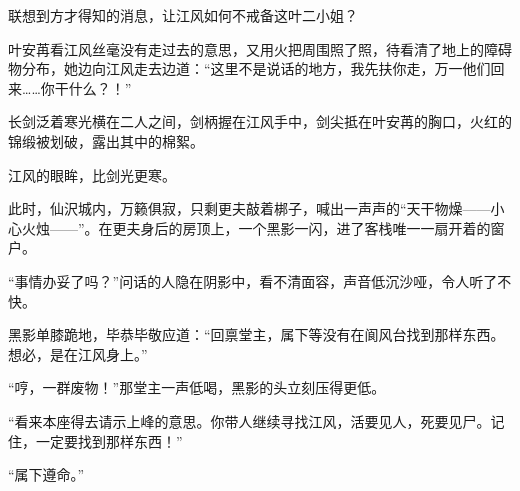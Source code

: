 联想到方才得知的消息，让江风如何不戒备这叶二小姐？

叶安苒看江风丝毫没有走过去的意思，又用火把周围照了照，待看清了地上的障碍物分布，她边向江风走去边道：“这里不是说话的地方，我先扶你走，万一他们回来……你干什么？！”

长剑泛着寒光横在二人之间，剑柄握在江风手中，剑尖抵在叶安苒的胸口，火红的锦缎被划破，露出其中的棉絮。

江风的眼眸，比剑光更寒。

此时，仙沢城内，万籁俱寂，只剩更夫敲着梆子，喊出一声声的“天干物燥——小心火烛——”。在更夫身后的房顶上，一个黑影一闪，进了客栈唯一一扇开着的窗户。

“事情办妥了吗？”问话的人隐在阴影中，看不清面容，声音低沉沙哑，令人听了不快。

黑影单膝跪地，毕恭毕敬应道：“回禀堂主，属下等没有在阆风台找到那样东西。想必，是在江风身上。”

“哼，一群废物！”那堂主一声低喝，黑影的头立刻压得更低。

“看来本座得去请示上峰的意思。你带人继续寻找江风，活要见人，死要见尸。记住，一定要找到那样东西！”

“属下遵命。”